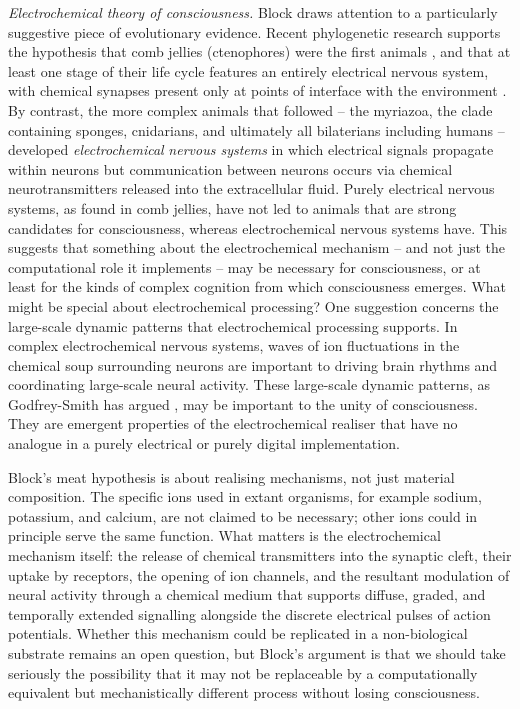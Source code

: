 \documentclass[11pt, a4paper, onecolumn, gdm]{google}
\begin{document}
\emph{Electrochemical theory of consciousness.} Block draws attention to a particularly suggestive piece of evolutionary evidence.
Recent phylogenetic research supports the hypothesis that comb jellies (ctenophores) were the first animals \citep{schultz2023}, and that at least one stage of their life cycle features an entirely electrical nervous system, with chemical synapses present only at points of interface with the environment \citep{burkhardt2023}.
By contrast, the more complex animals that followed -- the myriazoa, the clade containing sponges, cnidarians, and ultimately all bilaterians including humans -- developed \emph{electrochemical} \emph{nervous systems} in which electrical signals propagate within neurons but communication between neurons occurs via chemical neurotransmitters released into the extracellular fluid.
Purely electrical nervous systems, as found in comb jellies, have not led to animals that are strong candidates for consciousness, whereas electrochemical nervous systems have.
This suggests that something about the electrochemical mechanism -- and not just the computational role it implements -- may be necessary for consciousness, or at least for the kinds of complex cognition from which consciousness emerges.
What might be special about electrochemical processing?
One suggestion concerns the large-scale dynamic patterns that electrochemical processing supports.
In complex electrochemical nervous systems, waves of ion fluctuations in the chemical soup surrounding neurons are important to driving brain rhythms and coordinating large-scale neural activity.
These large-scale dynamic patterns, as Godfrey-Smith has argued \citep{godfreysmith2024}, may be important to the unity of consciousness.
They are emergent properties of the electrochemical realiser that have no analogue in a purely electrical or purely digital implementation.

Block's meat hypothesis is about realising mechanisms, not just material composition.
The specific ions used in extant organisms, for example sodium, potassium, and calcium, are not claimed to be necessary; other ions could in principle serve the same function.
What matters is the electrochemical mechanism itself: the release of chemical transmitters into the synaptic cleft, their uptake by receptors, the opening of ion channels, and the resultant modulation of neural activity through a chemical medium that supports diffuse, graded, and temporally extended signalling alongside the discrete electrical pulses of action potentials.
Whether this mechanism could be replicated in a non-biological substrate remains an open question, but Block's argument is that we should take seriously the possibility that it may not be replaceable by a computationally equivalent but mechanistically different process without losing consciousness.
\end{document}
